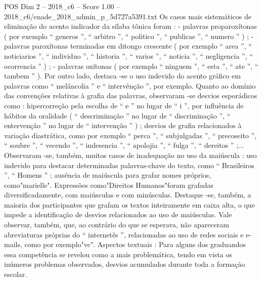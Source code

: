 \begin{textsample}{POS Dim 2 – 2018\_c6 – Score 1.00 – 2018\_c6/enade\_2018\_admin\_p\_5d727a5391.txt}
Os casos mais sistemáticos de eliminação do acento indicador da sílaba tônica foram : - palavras proparoxítonas ( por exemplo “ generos ”, “ arbitro ”, “ politico ”, “ publicas ”, “ numero ” ) ; - palavras paroxítonas terminadas em ditongo crescente ( por exemplo “ area ”, “ noticiarios ”, “ individuo ”, “ historia ”, “ varios ”, “ noticia ”, “ negligencia ”, “ ocorrencia ” ) ; - palavras oxítonas ( por exemplo “ ninguem ”, “ esta ”, “ ate ”, “ tambem ” ).
Por outro lado, destaca -se o uso indevido do acento gráfico em palavras como “ melâncolia ” e “ intervênção ”, por exemplo.
Quanto ao domínio das convenções relativas à grafia das palavras, observaram -se desvios esporádicos como : hipercorreção pela escolha de “ e ” no lugar de “ i ”, por influência de hábitos da oralidade ( “ descriminação ” no lugar de “ discriminação ”, “ entervenção ” no lugar de “ intervenção ” ) ; desvios de grafia relacionados à variação diastrática, como por exemplo “ perca ”, “ subjulgadas ”, “ precoseito ”, “ soubre ”, “ vecendo ”, “ indesencia ”, “ apolojia ”, “ fulga ”, “ dereitos ” ;...
Observaram -se, também, muitos casos de inadequação no uso da maiúscula : uso indevido para destacar determinadas palavras-chave do texto, como “ Brasileiros ”, “ Homens ” ; ausência de maiúscula para grafar nomes próprios, como"marielle".
Expressões como"Direitos Humanos"foram grafadas diversificadamente, com maiúsculas e com minúsculas.
Destaque -se, também, a maioria dos participantes que grafam os textos inteiramente em caixa alta, o que impede a identificação de desvios relacionados ao uso de maiúsculas.
Vale observar, também, que, ao contrário do que se esperava, não apareceram abreviaturas próprias do “ internetês ”, relacionadas ao uso de redes sociais e e-mails, como por exemplo"vc".
Aspectos textuais : Para alguns dos graduandos essa competência se revelou como a mais problemática, tendo em vista os inúmeros problemas observados, desvios acumulados durante toda a formação escolar.

\end{textsample}
